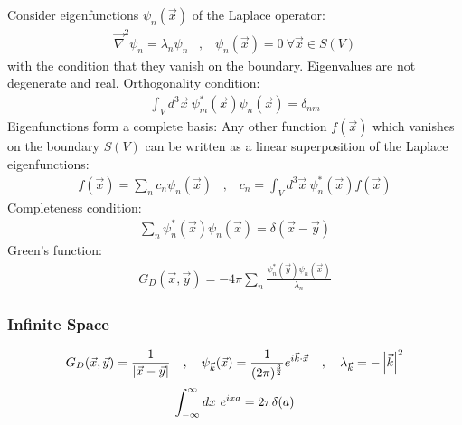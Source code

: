 Consider eigenfunctions $\psi_n(\vec{x})$ of the Laplace operator:
\begin{align*}
    \vec{\nabla}^2 \psi_n = \lambda_n \psi_n
    \hspace{10pt} , \hspace{10pt}
    \psi_n (\vec{x}) = 0 \ \forall \vec{x} \in S(V)
\end{align*}
with the condition that they vanish on the boundary. Eigenvalues are not
degenerate and real. Orthogonality condition:
\begin{align*}
    \int_V d^3 \vec{x} \ \psi_m^\ast (\vec{x}) \psi_n (\vec{x}) = \delta_{nm}
\end{align*}
Eigenfunctions form a complete basis: Any other function $f(\vec{x})$ which
vanishes on the boundary $S(V)$ can be written as a linear superposition
of the Laplace eigenfunctions:
\begin{align*}
    f(\vec{x}) = \sum_n c_n \psi_n (\vec{x})
    \hspace{10pt} , \hspace{10pt}
    c_n = \int_V d^3 \vec{x} \ \psi_n^\ast (\vec{x}) f(\vec{x})
\end{align*}
Completeness condition:
\begin{align*}
    \sum_n \psi_n^\ast (\vec{x}) \psi_n (\vec{x}) = \delta (\vec{x} - \vec{y})
\end{align*}
Green's function:
\begin{align*}
    G_D (\vec{x},\vec{y}) = - 4 \pi \sum_n \frac{\psi_n^\ast (\vec{y}) \psi_n (\vec{x})}{\lambda_n}
\end{align*}

\subsubsection{Infinite Space}
\begin{align*}
    G_D (\vec{x},\vec{y}) = \frac{1}{\left\vert \vec{x} - \vec{y} \right\vert}
    \hspace{10pt} , \hspace{10pt}
    \psi_{\vec{k}} (\vec{x}) = \frac{1}{(2 \pi)^{\frac{3}{2}}} e^{i \vec{k} \cdot \vec{x}}
    \hspace{10pt} , \hspace{10pt}
    \lambda_{\vec{k}} = - \left\vert \vec{k} \right\vert^2
\end{align*}
\begin{align*}
    \int_{-\infty}^\infty dx \ e^{ixa} = 2 \pi \delta(a)
\end{align*}

